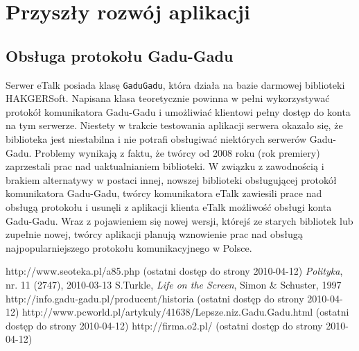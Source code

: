 \documentclass[a4paper,12pt]{article}
\begin{document}
\section[Przyszły rozwój aplikacji]{Przyszły rozwój aplikacji}
\subsection[Obsługa protokołu Gadu-Gadu]{Obsługa protokołu Gadu-Gadu}
Serwer eTalk posiada klasę \texttt{GaduGadu}, która działa na bazie darmowej biblioteki HAKGERSoft.
Napisana klasa teoretycznie powinna w pełni wykorzystywać protokół komunikatora Gadu-Gadu i umożliwiać klientowi pełny dostęp do konta na tym serwerze. Niestety w trakcie testowania aplikacji serwera okazało się, że biblioteka jest niestabilna i nie potrafi obsługiwać niektórych serwerów Gadu-Gadu. Problemy wynikają z faktu, że twórcy od 2008 roku (rok premiery) zaprzestali prac nad uaktualnianiem biblioteki. W związku z zawodnością i brakiem alternatywy w postaci innej, nowszej biblioteki obsługującej protokół komunikatora Gadu-Gadu, twórcy komunikatora eTalk zawiesili prace nad obsługą protokołu i usunęli z aplikacji klienta eTalk możliwość obsługi konta Gadu-Gadu.
Wraz z pojawieniem się nowej wersji, którejś ze starych bibliotek lub zupełnie nowej, twórcy aplikacji planują wznowienie prac nad obsługą najpopularniejszego protokołu komunikacyjnego w Polsce.

\begin{thebibliography}{9}
 http://www.seoteka.pl/a85.php (ostatni dostęp do strony 2010-04-12)
 \emph{Polityka}, nr. 11 (2747), 2010-03-13
 S.Turkle, \emph{Life on the Screen}, Simon \& Schuster, 1997
 http://info.gadu-gadu.pl/producent/historia (ostatni dostęp do strony 2010-04-12)
 http://www.pcworld.pl/artykuly/41638/Lepsze.niz.Gadu.Gadu.html (ostatni dostęp do strony 2010-04-12)
 http://firma.o2.pl/ (ostatni dostęp do strony 2010-04-12)
\end{thebibliography}
\end{document}

